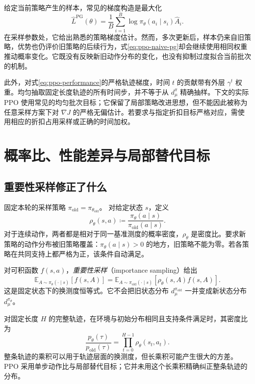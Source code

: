 \documentclass[UTF8,12pt,a4paper,fontset=fandol]{ctexart}
\begin{document}
给定当前策略产生的样本，常见的梯度构造是最大化
\begin{equation}
  \widehat L^{\mathrm{PG}}(\theta)
  =\frac1B\sum_{i=1}^{B}
  \log\pi_\theta(a_i\mid s_i)\widehat A_i.
  \label{eq:ppo-naive-pg}
\end{equation}
在采样参数处，它给出熟悉的策略梯度估计。然而，多次更新后，样本仍来自旧策略，优势也仍评价旧策略的后续行为，式\eqref{eq:ppo-naive-pg}却会继续使用相同权重推动概率变化。它既没有反映新旧动作分布的变化，也没有抑制过度拟合当前批次的机制。

此外，对式\eqref{eq:ppo-performance}的严格轨迹梯度，时间 $t$ 的贡献带有外层 $\gamma^t$ 权重。均匀抽取固定长度轨迹的所有时间步，并不等于从 $d^\pi_\mu$ 精确抽样。下文的实际 PPO 使用常见的均匀批次目标；它保留了局部策略改进思想，但不能因此被称为任意采样方案下对 $\nabla J$ 的严格无偏估计。若要求与指定折扣目标严格对应，需使用相应的折扣占用采样或正确的时间加权。

\section{概率比、性能差异与局部替代目标}
\label{sec:ppo-surrogate}

\subsection{重要性采样修正了什么}

固定本轮的采样策略 $\pi_{\mathrm{old}}=\pi_{\theta_{\mathrm{old}}}$。
对给定状态 $s$，定义
\begin{equation}
  \rho_\theta(s,a)
  \coloneqq\frac{\pi_\theta(a\mid s)}
                 {\pi_{\mathrm{old}}(a\mid s)}.
  \label{eq:ppo-ratio}
\end{equation}
对于连续动作，两者都是相对于同一基准测度的概率密度，$\rho_\theta$ 是密度比。要求新策略的动作分布被旧策略覆盖：$\pi_\theta(a\mid s)>0$ 的地方，旧策略不能为零。若各策略在共同支持上都严格为正，该条件自动满足。

对可积函数 $f(s,a)$，\emph{重要性采样}（importance sampling）给出
\begin{equation}
  \mathbb E_{A\sim\pi_\theta(\cdot\mid s)}[f(s,A)]
  =\mathbb E_{A\sim\pi_{\mathrm{old}}(\cdot\mid s)}
   [\rho_\theta(s,A)f(s,A)].
  \label{eq:ppo-is}
\end{equation}
这是固定状态下的换测度恒等式。它不会把旧状态分布
$d^{\pi_{\mathrm{old}}}_\mu$ 一并变成新状态分布
$d^{\pi_\theta}_\mu$。

对固定长度 $H$ 的完整轨迹，在环境与初始分布相同且支持条件满足时，其密度比为
\[
  \frac{p_\theta(\tau)}{p_{\mathrm{old}}(\tau)}
  =\prod_{t=0}^{H-1}\rho_\theta(s_t,a_t).
\]
整条轨迹的乘积可以用于轨迹层面的换测度，但长乘积可能产生很大的方差。PPO 采用单步动作比与局部替代目标；它并未用这个长乘积精确纠正整条轨迹的分布。
\end{document}

